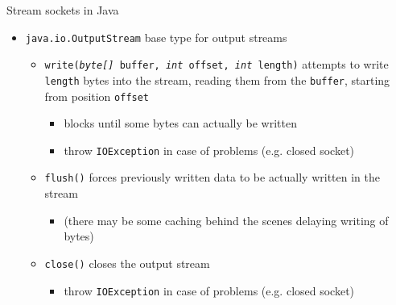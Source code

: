 \documentclass[presentation]{beamer}\mode<presentation>{\usetheme{AMSBolognaFC}}
\begin{document}
\begin{frame}[c, allowframebreaks]{Stream sockets in Java}
\begin{itemize}
        \item \texttt{java.io.\alert{OutputStream}} base type for output streams 
        \begin{itemize}
            \item \alert{\texttt{write(\textit{byte[]} buffer, \textit{int} offset, \textit{int} length)}} attempts to write \texttt{length} bytes into the stream, reading them from the \texttt{buffer}, starting from position \texttt{offset}
            \begin{itemize}
                \item blocks until some bytes can actually be written
                \item throw \texttt{IOException} in case of problems (e.g. closed socket)
            \end{itemize}
            \item \alert{\texttt{flush()}} forces previously written data to be actually written in the stream
            \begin{itemize}
                \item (there may be some caching behind the scenes delaying writing of bytes)
            \end{itemize}
            \item \alert{\texttt{close()}} closes the output stream
            \begin{itemize}
                \item throw \texttt{IOException} in case of problems (e.g. closed socket)
            \end{itemize}
        \end{itemize}

    \end{itemize}

    \framebreak


\end{frame}
\end{document}
